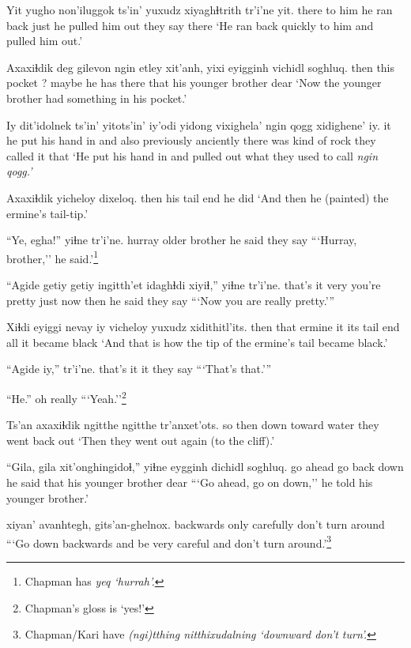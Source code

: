 \documentclass[12pt]{article}
\begin{document}
\gll Yit yugho non'iluggok ts'in' yuxudz xiyaghɬtrith tr'i'ne yit.
there {to him} {he ran back} {} just  {he pulled him out} {they say} there
\glt `He ran back quickly to him and pulled him out.'
\glend

\gll Axaxiɬdik deg gilevon ngin etley  xit'anh, yixi eyigginh vichidl  soghluq.
then  this pocket ? maybe {he has} there that  {his younger brother} dear
\glt `Now the younger brother had something in his pocket.'
\glend

\gll Iy dit'idolnek  ts'in' yitots'in' iy'odi  yidong vixighela' {ngin qogg} xidighene' iy.
it {he put his hand in} and also  previously anciently {there was} {kind of rock}  {they called it} that
\glt `He put his hand in and pulled out what they used to call \em ngin qogg.'
\glend

\gll Axaxiɬdik yicheloy dixeloq.
then  {his tail end} {he did}
\glt `And then he (painted) the ermine's tail-tip.'
\glend

\gll ``Ye, egha!'' yiɬne  tr'i'ne.
hurray {older brother} {he said} {they say}
\glt ```Hurray, brother,'' he said.'\footnote{Chapman has \em yeq \em `hurrah'.}
\glend

\gll ``Agide getiy getiy ingitth'et idaghɬdi xiyiɬ,'' yiɬne  tr'i'ne.
{that's it} very {} {you're pretty} {just now} then {he said} {they say}
\glt ```Now you are really pretty.'''
\glend

\gll Xiɬdi eyiggi  nevay  iy vicheloy yuxudz xidithitl'its.
then that ermine  it {its tail end} all {it became black}
\glt `And that is how the tip of the ermine's tail became black.'
\glend

\gll ``Agide iy,'' tr'i'ne.
{that's it}  it {they say}
\glt ```That's that.'''
\glend

\gll ``He.''
{{oh really}} 
\glt ```Yeah.''\footnote{Chapman's gloss is `yes!'}
\glend

\gll  Ts'an axaxiɬdik ngitthe ngitthe  tr'anxet'ots.
so then  {down toward water} {}  {they went back out}
\glt `Then they went out again (to the cliff).'
\glend

\gll ``Gila, gila xit'onghingidoɬ,'' yiɬne  eygginh dichidl soghluq.
{go ahead} {} {go back down} {he said} that {his younger brother} dear
\glt ```Go ahead, go on down,'' he told his younger brother.'
\glend

  xiyan' avanhtegh, gits'an-ghelnox.
backwards  only  carefully {don't turn around}
\glt ```Go down backwards and be very careful and don't turn around.'\footnote{Chapman/Kari have \em (ngi)tthing nitthixudalning \em `downward don't turn'.}
\glend
\end{document}
